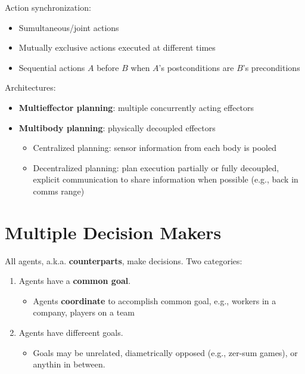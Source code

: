 \documentclass[11pt]{article}
\begin{document}
Action synchronization:

\begin{itemize}
\item Sumultaneous/joint actions
\item Mutually exclusive actions executed at different times
\item Sequential actions \(A\) before \(B\) when \(A\)'s postconditions are \(B\)'s preconditions
\end{itemize}

Architectures:

\begin{itemize}
\item \textbf{Multieffector planning}: multiple concurrently acting effectors
\item \textbf{Multibody planning}: physically decoupled effectors

\begin{itemize}
\item Centralized planning: sensor information from each body is pooled
\item Decentralized planning: plan execution partially or fully decoupled, explicit communication to share information when possible (e.g., back in comms range)
\end{itemize}
\end{itemize}
\section{Multiple Decision Makers}
\label{sec:org1caad37}

All agents, a.k.a. \textbf{counterparts}, make decisions.  Two categories:

\begin{enumerate}
\item Agents have a \textbf{common goal}.

\begin{itemize}
\item Agents \textbf{coordinate} to accomplish common goal, e.g., workers in a company, players on a team
\end{itemize}

\item Agents have differeent goals.

\begin{itemize}
\item Goals may be unrelated, diametrically opposed (e.g., zer-sum games), or anythin in between.
\end{itemize}
\end{enumerate}
\end{document}
